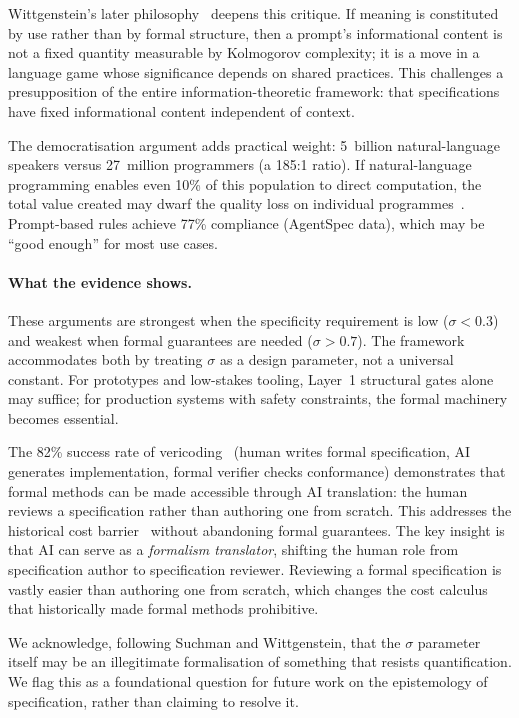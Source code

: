 Wittgenstein's later philosophy~\citep{wittgenstein1953philosophical} deepens
this critique.  If meaning is constituted by use rather than by formal
structure, then a prompt's informational content is not a fixed quantity
measurable by Kolmogorov complexity; it is a move in a language game whose
significance depends on shared practices.  This challenges a presupposition of
the entire information-theoretic framework: that specifications have fixed
informational content independent of context.

The democratisation argument adds practical weight: 5~billion natural-language
speakers versus 27~million programmers (a 185:1 ratio).  If natural-language
programming enables even 10\% of this population to direct computation, the
total value created may dwarf the quality loss on individual
programmes~\citep{litt2023malleable, altman2024intelligence}.  Prompt-based
rules achieve 77\% compliance (AgentSpec data), which may be ``good enough''
for most use cases.

\paragraph{What the evidence shows.}
These arguments are strongest when the specificity requirement is low
($\sigma < 0.3$) and weakest when formal guarantees are needed
($\sigma > 0.7$).  The framework accommodates both by treating $\sigma$ as a
design parameter, not a universal constant.  For prototypes and low-stakes
tooling, Layer~1 structural gates alone may suffice; for production systems with
safety constraints, the formal machinery becomes essential.

The 82\% success rate of vericoding~\citep{vericoding2025} (human writes formal
specification, AI generates implementation, formal verifier checks conformance)
demonstrates that formal methods can be made accessible through AI translation:
the human reviews a specification rather than authoring one from scratch.  This
addresses the historical cost barrier~\citep{kleppmann2025formal} without
abandoning formal guarantees.  The key insight is that AI can serve as a
\emph{formalism translator}, shifting the human role from specification author
to specification reviewer.  Reviewing a formal specification is vastly easier
than authoring one from scratch, which changes the cost calculus that
historically made formal methods prohibitive.

We acknowledge, following Suchman and Wittgenstein, that the $\sigma$ parameter
itself may be an illegitimate formalisation of something that resists
quantification.  We flag this as a foundational question for future work on the
epistemology of specification, rather than claiming to resolve it.

